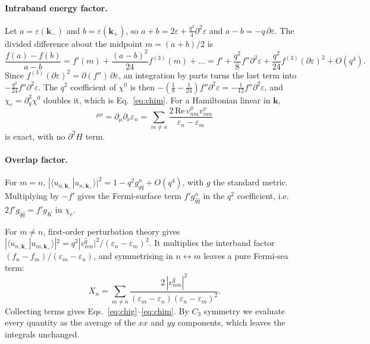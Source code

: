 \documentclass[11pt,a4paper]{article}
\numberwithin{equation}{section}
\newcommand{\bk}{\mathbf{k}}
\newcommand{\chie}{\chi_{e}}
\begin{document}
\paragraph{Intraband energy factor.}
Let $a=\varepsilon(\bk_-)$ and $b=\varepsilon(\bk_+)$, so $a+b=2\varepsilon+\tfrac{q^2}{4}\partial^2\varepsilon$ and $a-b=-q\,\partial\varepsilon$. The divided difference about the midpoint $m=(a+b)/2$ is
\begin{equation}
\frac{f(a)-f(b)}{a-b}=f'(m)+\frac{(a-b)^2}{24}f^{(3)}(m)+\dots
=f'+\frac{q^2}{8}f''\partial^2\varepsilon+\frac{q^2}{24}f^{(3)}(\partial\varepsilon)^2+O(q^4).
\end{equation}
Since $f^{(3)}(\partial\varepsilon)^2=\partial(f'')\,\partial\varepsilon$, an integration by parts turns the last term into $-\tfrac{q^2}{24}f''\partial^2\varepsilon$. The $q^2$ coefficient of $\chi^0$ is then $-(\tfrac18-\tfrac1{24})f''\partial^2\varepsilon=-\tfrac1{12}f''\partial^2\varepsilon$, and $\chie=\partial_q^2\chi^0$ doubles it, which is Eq.~\eqref{eq:chim}. For a Hamiltonian linear in $\bk$,
\begin{equation}
[m_n^{-1}]^{\mu\nu}=\partial_\mu\partial_\nu\varepsilon_n=\sum_{m\neq n}\frac{2\,\mathrm{Re}\,v^\mu_{nm}v^\nu_{mn}}{\varepsilon_n-\varepsilon_m}
\end{equation}
is exact, with no $\partial^2H$ term.

\paragraph{Overlap factor.}
For $m=n$, $|\langle u_{n,\bk_-}|u_{n,\bk_+}\rangle|^2=1-q^2g^n_{\hat q\hat q}+O(q^4)$, with $g$ the standard metric. Multiplying by $-f'$ gives the Fermi-surface term $f'g^n_{\hat q\hat q}$ in the $q^2$ coefficient, i.e.\ $2f'g_{\hat q\hat q}=f'g_K$ in $\chie$.

For $m\ne n$, first-order perturbation theory gives $|\langle u_{n,\bk_-}|u_{m,\bk_+}\rangle|^2=q^2|v^{\hat q}_{nm}|^2/(\varepsilon_n-\varepsilon_m)^2$. It multiplies the interband factor $(f_n-f_m)/(\varepsilon_m-\varepsilon_n)$, and symmetrising in $n\leftrightarrow m$ leaves a pure Fermi-sea term:
\begin{equation}
X_n=\sum_{m\neq n}\frac{2\,|v^{\hat q}_{nm}|^2}{(\varepsilon_m-\varepsilon_n)(\varepsilon_n-\varepsilon_m)^2}.
\end{equation}
Collecting terms gives Eqs.~\eqref{eq:chig}--\eqref{eq:chim}. By $C_3$ symmetry we evaluate every quantity as the average of the $xx$ and $yy$ components, which leaves the integrals unchanged.
\end{document}
